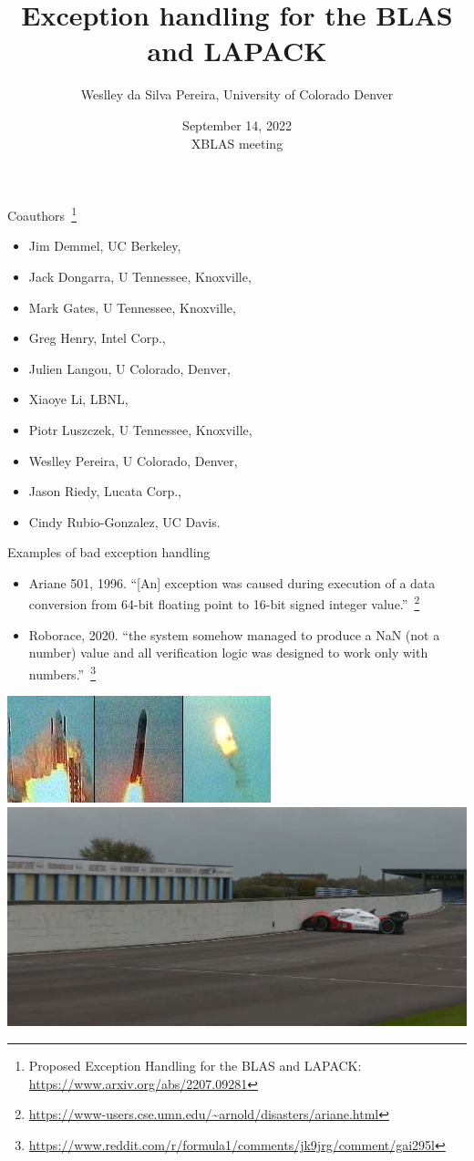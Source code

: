 \documentclass[11pt]{beamer}
\author{Weslley da Silva Pereira, University of Colorado Denver}
\title{Exception handling for the BLAS and LAPACK}
\date{September 14, 2022 \\\vspace{10pt} {\small XBLAS meeting}}
\begin{document}
\begin{frame}
\titlepage
\end{frame}

\begin{frame}{Coauthors~\footnote{Proposed Exception Handling
	for the BLAS and LAPACK:\\ \url{https://www.arxiv.org/abs/2207.09281}}}

	\begin{itemize}
		\item Jim Demmel, UC Berkeley,
		\item Jack Dongarra, U Tennessee, Knoxville,
		\item Mark Gates, U Tennessee, Knoxville,
		\item Greg Henry, Intel Corp.,
		\item Julien Langou, U Colorado, Denver,
		\item Xiaoye Li, LBNL,
		\item Piotr Luszczek, U Tennessee, Knoxville,
		\item Weslley Pereira, U Colorado, Denver,
		\item Jason Riedy, Lucata Corp.,
		\item Cindy Rubio-Gonzalez, UC Davis.
	\end{itemize}
	
\end{frame}

\begin{frame}{Examples of bad exception handling}

	\begin{itemize}
		\item Ariane 501, 1996. ``[An] exception was caused during execution of a data conversion from 64-bit floating point to 16-bit signed integer value.''~\footnote{\url{https://www-users.cse.umn.edu/~arnold/disasters/ariane.html}}
		\item Roborace, 2020. ``the system somehow managed to produce a NaN (not a number) value and all verification logic was designed to work only with numbers.''~\footnote{\url{https://www.reddit.com/r/formula1/comments/jk9jrg/comment/gai295l}}
	\end{itemize}

	\vspace{10pt}
	\begin{center}
		\includegraphics[width=.53\linewidth]{img/ariane}
		\hfill
		\includegraphics[width=.45\linewidth]{img/roborace}
	\end{center}
\end{frame}
\end{document}
